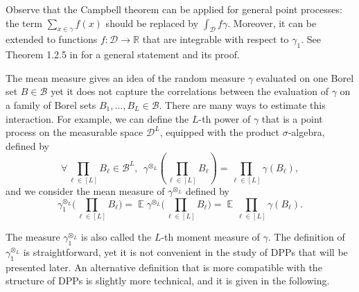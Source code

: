 \documentclass[twoside,11pt]{book}
\numberwithin{theorem}{chapter}
\numberwithin{definition}{chapter}
\numberwithin{proposition}{chapter}
\numberwithin{corollary}{chapter}
\numberwithin{example}{chapter}
\numberwithin{lemma}{chapter}
\numberwithin{assumption}{chapter}
\DeclareMathOperator{\EX}{\mathbb{E}}
\begin{document}
Observe that the Campbell theorem can be applied for general point processes: the term $\sum_{x \in \gamma} f(x)$ should be replaced by $\int_{\mathcal{D}} f \gamma$. Moreover, it can be extended to functions $f: \mathcal{D} \rightarrow \mathbb{R}$ that are integrable with respect to $\gamma_1$. See Theorem 1.2.5 in \citep{BaBlKa20} for a general statement and its proof.

The mean measure gives an idea of the random measure $\gamma$ evaluated on one Borel set $B \in \mathcal{B}$ yet it does not capture the correlations between the evaluation of $\gamma$ on a family of Borel sets $B_{1}, \dots, B_{L} \in \mathcal{B}$. There are many ways to estimate this interaction. For example, we can define the $L$-th power of $\gamma$ that is a point process on the measurable space $\mathcal{D}^{L}$, equipped with the product $\sigma$-algebra, defined by
\begin{equation}
\forall \prod\limits_{\ell \in [L]} B_{\ell} \in \mathcal{B}^{L}, \:\: \gamma^{\otimes_{L}}(\prod\limits_{\ell \in [L]} B_{\ell}) = \prod\limits_{\ell \in [L]} \gamma(B_{\ell}),
\end{equation}
and we consider the mean measure of  $\gamma^{\otimes_{L}}$ defined by
\begin{equation}
\gamma^{\otimes_{L}}_{1} \big(\prod\limits_{\ell \in [L]} B_\ell \big) = \EX  \gamma^{\otimes_{L}} \big(\prod\limits_{\ell \in [L]} B_\ell \big) = \EX   \prod\limits_{\ell \in [L]} \gamma(B_{\ell}).
\end{equation}



The measure $\gamma_{1}^{\otimes_{L}}$ is also called the $L$-th moment measure of $\gamma$. The definition of $\gamma^{\otimes_{L}}_{1}$ is straightforward, yet it is not convenient in the study of DPPs that will be presented later.  
An alternative definition that is more compatible with the structure of DPPs is slightly more technical, and it is given in the following. 
\end{document}
